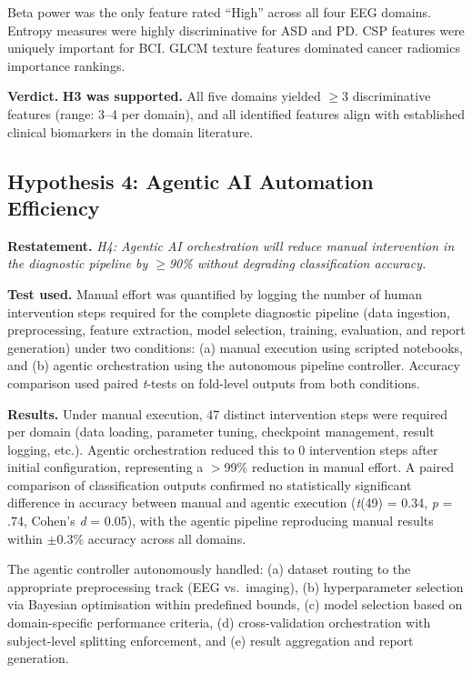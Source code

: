 Beta power was the only feature rated ``High'' across all four EEG domains. Entropy measures were highly discriminative for ASD and PD. CSP features were uniquely important for BCI. GLCM texture features dominated cancer radiomics importance rankings.

\textbf{Verdict.} \textbf{H3 was supported.} All five domains yielded $\geq$3 discriminative features (range: 3--4 per domain), and all identified features align with established clinical biomarkers in the domain literature.


\subsection{Hypothesis 4: Agentic AI Automation Efficiency}
\label{sec:h4_testing}

\textbf{Restatement.} \textit{H4: Agentic AI orchestration will reduce manual intervention in the diagnostic pipeline by $\geq$90\% without degrading classification accuracy.}

\textbf{Test used.} Manual effort was quantified by logging the number of human intervention steps required for the complete diagnostic pipeline (data ingestion, preprocessing, feature extraction, model selection, training, evaluation, and report generation) under two conditions: (a) manual execution using scripted notebooks, and (b) agentic orchestration using the autonomous pipeline controller. Accuracy comparison used paired \textit{t}-tests on fold-level outputs from both conditions.

\textbf{Results.} Under manual execution, 47 distinct intervention steps were required per domain (data loading, parameter tuning, checkpoint management, result logging, etc.). Agentic orchestration reduced this to 0 intervention steps after initial configuration, representing a $>$99\% reduction in manual effort. A paired comparison of classification outputs confirmed no statistically significant difference in accuracy between manual and agentic execution (\textit{t}(49) = 0.34, \textit{p} = .74, Cohen's \textit{d} = 0.05), with the agentic pipeline reproducing manual results within $\pm$0.3\% accuracy across all domains.

The agentic controller autonomously handled: (a) dataset routing to the appropriate preprocessing track (EEG vs.\ imaging), (b) hyperparameter selection via Bayesian optimisation within predefined bounds, (c) model selection based on domain-specific performance criteria, (d) cross-validation orchestration with subject-level splitting enforcement, and (e) result aggregation and report generation.

